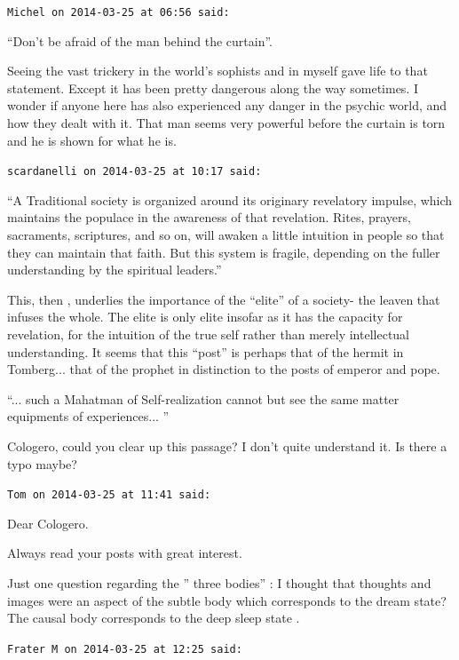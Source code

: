 \begin{footnotesize}
\begin{sffamily}
\texttt{Michel on 2014-03-25 at 06:56 said:}

``Don't be afraid of the man behind the curtain''.

Seeing the vast trickery in the world's sophists and in myself gave life to that statement. Except it has been pretty dangerous along the way sometimes. I wonder if anyone here has also experienced any danger in the psychic world, and how they dealt with it. That man seems very powerful before the curtain is torn and he is shown for what he is.

\hfill

\texttt{scardanelli on 2014-03-25 at 10:17 said:}

``A Traditional society is organized around its originary revelatory impulse, which maintains the populace in the awareness of that revelation. Rites, prayers, sacraments, scriptures, and so on, will awaken a little intuition in people so that they can maintain that faith. But this system is fragile, depending on the fuller understanding by the spiritual leaders.''

This, then , underlies the importance of the ``elite'' of a society- the leaven that infuses the whole. The elite is only elite insofar as it has the capacity for revelation, for the intuition of the true self rather than merely intellectual understanding. It seems that this ``post'' is perhaps that of the hermit in Tomberg... that of the prophet in distinction to the posts of emperor and pope.

``... such a Mahatman of Self-realization cannot but see the same matter equipments of experiences... ''

Cologero, could you clear up this passage? I don't quite understand it. Is there a typo maybe?

\hfill

\texttt{Tom on 2014-03-25 at 11:41 said:}

Dear Cologero.

Always read your posts with great interest.

Just one question regarding the '' three bodies'' : I thought that thoughts and images were an aspect of the subtle body which corresponds to the dream state? The causal body corresponds to the deep sleep state .

\hfill

\texttt{Frater M on 2014-03-25 at 12:25 said:}


\end{sffamily}
\end{footnotesize}
